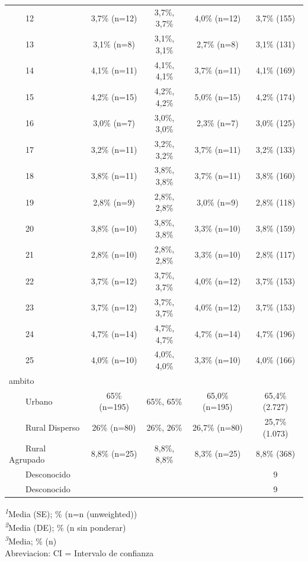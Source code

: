 \documentclass[
  spanish,
  a4paper,
]{scrreprt}
\begin{document}
\begin{table}
{\begin{tabular*}{\linewidth}{@{\extracolsep{\fill}}lcccc}
    12 & 3,7\% (n=12) & 3,7\%, 3,7\% & 4,0\% (n=12) & 3,7\% (155) \\ 
    13 & 3,1\% (n=8) & 3,1\%, 3,1\% & 2,7\% (n=8) & 3,1\% (131) \\ 
    14 & 4,1\% (n=11) & 4,1\%, 4,1\% & 3,7\% (n=11) & 4,1\% (169) \\ 
    15 & 4,2\% (n=15) & 4,2\%, 4,2\% & 5,0\% (n=15) & 4,2\% (174) \\ 
    16 & 3,0\% (n=7) & 3,0\%, 3,0\% & 2,3\% (n=7) & 3,0\% (125) \\ 
    17 & 3,2\% (n=11) & 3,2\%, 3,2\% & 3,7\% (n=11) & 3,2\% (133) \\ 
    18 & 3,8\% (n=11) & 3,8\%, 3,8\% & 3,7\% (n=11) & 3,8\% (160) \\ 
    19 & 2,8\% (n=9) & 2,8\%, 2,8\% & 3,0\% (n=9) & 2,8\% (118) \\ 
    20 & 3,8\% (n=10) & 3,8\%, 3,8\% & 3,3\% (n=10) & 3,8\% (159) \\ 
    21 & 2,8\% (n=10) & 2,8\%, 2,8\% & 3,3\% (n=10) & 2,8\% (117) \\ 
    22 & 3,7\% (n=12) & 3,7\%, 3,7\% & 4,0\% (n=12) & 3,7\% (153) \\ 
    23 & 3,7\% (n=12) & 3,7\%, 3,7\% & 4,0\% (n=12) & 3,7\% (153) \\ 
    24 & 4,7\% (n=14) & 4,7\%, 4,7\% & 4,7\% (n=14) & 4,7\% (196) \\ 
    25 & 4,0\% (n=10) & 4,0\%, 4,0\% & 3,3\% (n=10) & 4,0\% (166) \\ 
ambito &  &  &  &  \\ 
    Urbano & 65\% (n=195) & 65\%, 65\% & 65,0\% (n=195) & 65,4\% (2.727) \\ 
    Rural Disperso & 26\% (n=80) & 26\%, 26\% & 26,7\% (n=80) & 25,7\% (1.073) \\ 
    Rural Agrupado & 8,8\% (n=25) & 8,8\%, 8,8\% & 8,3\% (n=25) & 8,8\% (368) \\ 
    Desconocido &  &  &  & 9 \\ 
    Desconocido &  &  &  & 9 \\ 
\bottomrule
\end{tabular*}
\begin{minipage}{\linewidth}
\textsuperscript{\textit{1}}Media (SE); \% (n=n (unweighted))\\
\textsuperscript{\textit{2}}Media (DE); \% (n sin ponderar)\\
\textsuperscript{\textit{3}}Media; \% (n)\\
Abreviacion: CI = Intervalo de confianza\\
\end{minipage}

}

\end{table}%
\end{document}
